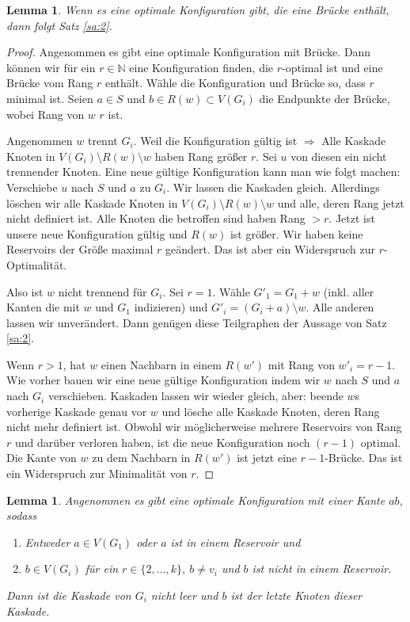 \documentclass[12pt,a4paper]{scrartcl}
\numberwithin{equation}{section} %
\theoremstyle{definition}
\theoremstyle{plain}
\newtheorem{lem}[auf]{Lemma}
\newcommand{\nn}{\mathbb{N}}
\begin{document}
\begin{lem}
Wenn es eine optimale Konfiguration gibt, die eine Brücke enthält, dann folgt Satz \ref{sa:2}.
\label{lem:3}
\end{lem}
\begin{proof}
Angenommen es gibt eine optimale Konfiguration mit Brücke. Dann können wir für ein $r\in\nn$ eine Konfiguration finden, die $r$-optimal ist und eine Brücke vom Rang $r$ enthält. Wähle die Konfiguration und Brücke so, dass $r$ minimal ist. Seien $a\in S$ und $b\in R(w)\subset V(G_i)$ die Endpunkte der Brücke, wobei Rang von $w$ $r$ ist.\par
Angenommen $w$ trennt $G_i$. Weil die Konfiguration gültig ist $\Rightarrow$ Alle Kaskade Knoten in $V(G_i)\setminus R(w)\setminus w$ haben Rang größer $r$. Sei $u$ von diesen ein nicht trennender Knoten. Eine neue gültige Konfiguration kann man wie folgt machen: Verschiebe $u$ nach $S$ und $a$ zu $G_i$. Wir lassen die Kaskaden gleich. Allerdings löschen wir alle Kaskade Knoten in $V(G_i)\setminus R(w)\setminus w$  und alle, deren Rang jetzt nicht definiert ist. Alle Knoten die betroffen sind haben Rang $>r$. Jetzt ist unsere neue Konfiguration gültig und $R(w)$ ist größer. Wir haben keine Reservoirs der Größe maximal $r$ geändert. Das ist aber ein Widerspruch zur $r$-Optimalität.\par 
Also ist $w$ nicht trennend für $G_i$. Sei $r=1$. Wähle $G'_1=G_1+w$ (inkl. aller Kanten die mit $w$ und $G_1$ indizieren) und $G'_i=(G_i+a)\setminus w$. Alle anderen lassen wir unverändert. Dann genügen diese Teilgraphen der Aussage von Satz \ref{sa:2}. \par 
Wenn $r>1$, hat $w$ einen Nachbarn in einem $R(w')$ mit Rang von $w'_i=r-1$. Wie vorher bauen wir eine neue gültige Konfiguration indem wir $w$ nach $S$ und $a$ nach $G_i$ verschieben. Kaskaden lassen wir wieder gleich, aber: beende $w$s vorherige Kaskade genau vor $w$ und lösche alle Kaskade Knoten, deren Rang nicht mehr definiert ist. Obwohl wir möglicherweise mehrere Reservoirs von Rang $r$ und darüber verloren haben, ist die neue Konfiguration noch $(r-1)$ optimal. Die Kante von $w$ zu dem Nachbarn in $R(w')$ ist jetzt eine $r-1$-Brücke. Das ist ein Widerspruch zur Minimalität von $r$.
\end{proof}
\begin{lem}
\label{lem:4}
Angenommen es gibt eine optimale Konfiguration mit einer Kante $ab$, sodass  
\begin{enumerate}
\item Entweder $a\in V(G_1)$ oder $a$ ist in einem Reservoir und
\item $b\in V(G_i)$ für ein $r\in\lbrace 2,\dotsc,k\rbrace,~b\neq v_i$ und $b$ ist nicht in einem Reservoir.
\end{enumerate}
Dann ist die Kaskade von $G_i$ nicht leer und $b$ ist der letzte Knoten dieser Kaskade.
\end{lem}
\end{document}
